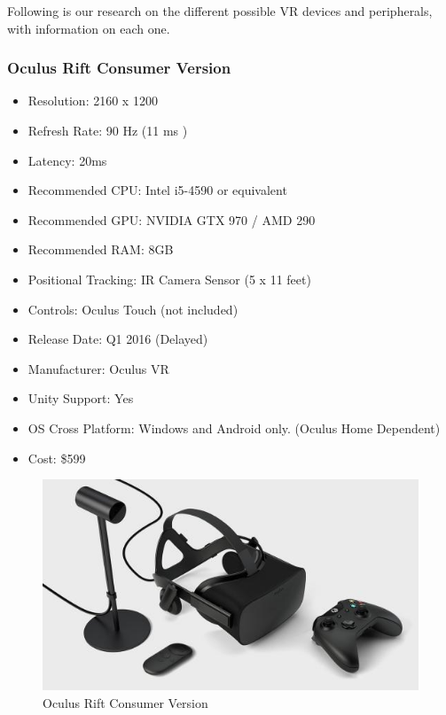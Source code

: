 \documentclass[a4paper,10pt]{article}
\begin{document}
Following is our research on the different possible VR devices and peripherals, with information on each one.   
\subsubsection{Oculus Rift Consumer Version}
\begin{itemize}
	\item Resolution: 2160 x 1200
	\item Refresh Rate: 90 Hz (11 ms )
	\item Latency: 20ms
	\item Recommended CPU: Intel i5-4590 or equivalent
	\item Recommended GPU: NVIDIA GTX 970 / AMD 290 
	\item Recommended RAM: 8GB
	\item Positional Tracking: IR Camera Sensor (5 x 11 feet)
	\item Controls: Oculus Touch (not included)
	\item Release Date: Q1 2016 (Delayed)
	\item Manufacturer: Oculus VR
	\item Unity Support: Yes
	\item OS Cross Platform: Windows and Android only. (Oculus Home Dependent)
	\item Cost: \$599
\end{itemize}
\begin{figure}[H]
	\includegraphics[width=\linewidth,height=\paperheight,keepaspectratio]{cv.jpg}
	\caption{Oculus Rift Consumer Version}
	\label{fig:RiftCVImg}
	\end{figure}
	\pagebreak
\end{document}
